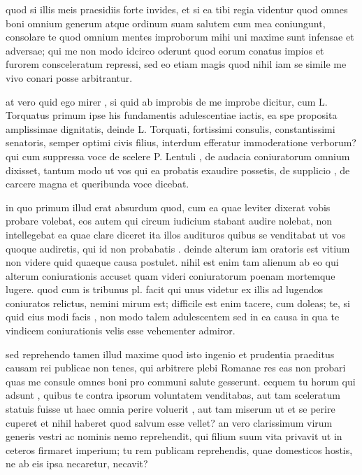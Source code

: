  quod si illis meis praesidiis forte invides, et si ea tibi regia videntur quod omnes boni omnium generum atque ordinum suam salutem cum mea coniungunt, consolare te quod omnium mentes improborum mihi uni maxime sunt infensae et adversae; qui me non modo idcirco oderunt quod eorum conatus impios et furorem consceleratum repressi, sed eo etiam magis quod nihil iam se simile me vivo conari posse arbitrantur.

 at vero quid ego mirer , si quid ab improbis de me improbe dicitur, cum L. Torquatus primum ipse his fundamentis adulescentiae iactis, ea spe proposita amplissimae dignitatis, deinde L. Torquati, fortissimi consulis, constantissimi senatoris, semper optimi civis filius, interdum efferatur immoderatione verborum? qui cum suppressa voce de scelere P. Lentuli , de audacia coniuratorum omnium dixisset, tantum modo ut vos qui ea probatis exaudire possetis, de supplicio , de carcere magna et queribunda voce dicebat.

 in quo primum illud erat absurdum quod, cum ea quae leviter dixerat vobis probare volebat, eos autem qui circum iudicium stabant audire nolebat, non intellegebat ea quae clare diceret ita illos audituros quibus se venditabat ut vos quoque audiretis, qui id non probabatis . deinde alterum iam oratoris est vitium non videre quid quaeque causa postulet. nihil est enim tam alienum ab eo qui alterum coniurationis accuset quam videri coniuratorum poenam mortemque lugere. quod cum is tribunus pl. facit qui unus videtur ex illis ad lugendos coniuratos relictus, nemini mirum est; difficile est enim tacere, cum doleas; te, si quid eius modi facis , non modo talem adulescentem sed in ea causa in qua te vindicem coniurationis velis esse vehementer admiror.

 sed reprehendo tamen illud maxime quod isto ingenio et prudentia praeditus causam rei publicae non tenes, qui arbitrere plebi Romanae res eas non probari quas me consule omnes boni pro communi salute gesserunt. ecquem tu horum qui adsunt , quibus te contra ipsorum voluntatem venditabas, aut tam sceleratum statuis fuisse ut haec omnia perire voluerit , aut tam miserum ut et se perire cuperet et nihil haberet quod salvum esse vellet? an vero clarissimum virum generis vestri ac nominis nemo reprehendit, qui filium suum vita privavit ut in ceteros firmaret imperium; tu rem publicam reprehendis, quae domesticos hostis, ne ab eis ipsa necaretur, necavit?

